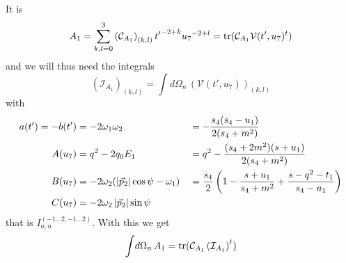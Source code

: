 It is
\begin{equation}
A_1 = \sum_{k,l=0}^{3} \left(\mathcal C_{A_1}\right)_{(k,l)} {t'}^{-2+k} {u_7}^{-2+l} = \operatorname{\text{tr}}(\mathcal C_{A_1} \mathcal V(t',u_7)^t)
\end{equation}
and we will thus need the integrals
\begin{equation}
\left(\mathcal I_{A_1}\right)_{(k,l)} = \int\!d\Omega_n\,\left(\mathcal V(t',u_7)\right)_{(k,l)}
\end{equation}
with
\begin{align}
a(t') = -b(t') &= -2\omega_1\omega_2 &&= -\frac{s_4(s_4-u_1)}{2(s_4+m^2)}\\
A(u_7) &= q^2-2q_0E_1 &&= q^2-\frac{(s_4+2m^2)(s+u_1)}{2(s_4+m^2)}\\
B(u_7) &= -2\omega_2(\left|\vec p_2\right|\cos\psi-\omega_1) &&=\frac {s_4}{2}\left(1-\frac{s+u_1}{s_4+m^2}+\frac{s-q^2-t_1}{s_4-u_1}\right)\\
C(u_7) &= -2\omega_2\left|\vec p_2\right|\sin\psi
\end{align}
that is $I_{a,n}^{(-1\ldots 2,-1\ldots 2)}$. With this we get
\begin{equation}
\int\!d\Omega_n\,A_1 = \operatorname{\text{tr}}(\mathcal C_{A_1} \left(\mathcal I_{A_1}\right)^t)
\end{equation}

